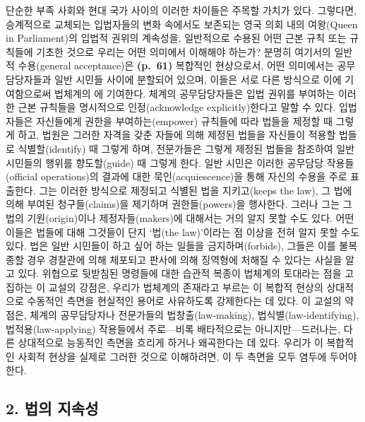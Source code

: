 단순한 부족 사회와 현대 국가 사이의 이러한 차이들은 주목할 가치가 있다.
그렇다면, 승계적으로 교체되는 입법자들의 변화 속에서도 보존되는 영국
의회 내의 여왕(Queen in Parliament)의 입법적 권위의 계속성을, 일반적으로
수용된 어떤 근본 규칙 또는 규칙들에 기초한 것으로 우리는 어떤 의미에서
이해해야 하는가? 분명히 여기서의 일반적 수용(general acceptance)은
\textbf{(p.~61)} 복합적인 현상으로서, 어떤 의미에서는 공무담당자들과
일반 시민들 사이에 분할되어 있으며, 이들은 서로 다른 방식으로 이에
기여함으로써 법체계의 에 기여한다. 체계의
공무담당자들은 입법 권위를 부여하는 이러한 근본 규칙들을 명시적으로
인정(acknowledge explicitly)한다고 말할 수 있다. 입법자들은 자신들에게
권한을 부여하는(empower) 규칙들에 따라 법들을 제정할 때 그렇게 하고,
법원은 그러한 자격을 갖춘 자들에 의해 제정된 법들을 자신들이 적용할
법들로 식별할(identify) 때 그렇게 하며, 전문가들은 그렇게 제정된 법들을
참조하여 일반 시민들의 행위를 향도할(guide) 때 그렇게 한다. 일반 시민은
이러한 공무담당 작용들(official operations)의 결과에 대한
묵인(acquiescence)을 통해 자신의 수용을 주로 표출한다. 그는 이러한
방식으로 제정되고 식별된 법을 지키고(keeps the law), 그 법에 의해 부여된
청구들(claims)을 제기하며 권한들(powers)을 행사한다. 그러나 그는 그 법의
기원(origin)이나 제정자들(makers)에 대해서는 거의 알지 못할 수도 있다.
어떤 이들은 법들에 대해 그것들이 단지 ‘법(the law)’이라는 점 이상을 전혀
알지 못할 수도 있다. 법은 일반 시민들이 하고 싶어 하는 일들을
금지하며(forbids), 그들은 이를 불복종할 경우 경찰관에 의해 체포되고
판사에 의해 징역형에 처해질 수 있다는 사실을 알고 있다. 위협으로
뒷받침된 명령들에 대한 습관적 복종이 법체계의 토대라는 점을 고집하는 이
교설의 강점은, 우리가 법체계의 존재라고 부르는 이 복합적 현상의
상대적으로 수동적인 측면을 현실적인 용어로 사유하도록 강제한다는 데
있다. 이 교설의 약점은, 체계의 공무담당자나 전문가들의
법창출(law-making), 법식별(law-identifying), 법적용(law-applying)
작용들에서 주로---비록 배타적으로는 아니지만---드러나는, 다른 상대적으로
능동적인 측면을 흐리게 하거나 왜곡한다는 데 있다. 우리가 이 복합적인
사회적 현상을 실제로 그러한 것으로 이해하려면, 이 두 측면을 모두 염두에
두어야 한다.

\subsection{2. 법의 지속성}\label{uxbc95uxc758-uxc9c0uxc18duxc131}

